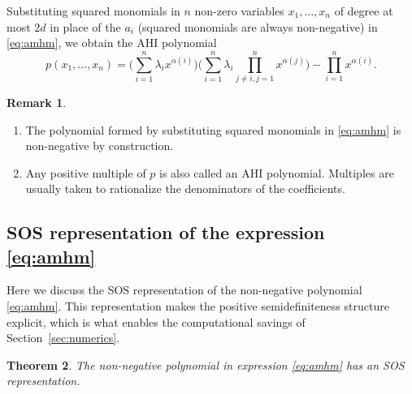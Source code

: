 \documentclass[12pt]{elsarticle}
\newtheorem{theorem}{Theorem}[section]
\theoremstyle{definition}
\newtheorem{remark}[theorem]{Remark}
\begin{document}
Substituting squared monomials in $n$ non-zero variables $x_1,\dots,x_n$ of degree at most $2d$ in place of the $a_i$ (squared monomials are always non-negative) in \eqref{eq:amhm}, we obtain the AHI polynomial
\begin{equation}\label{eq:ahi-sub}
    p(x_1,\dots,x_n)=\Big(\sum_{i=1}^n \lambda_i x^{\alpha(i)}\Big) \Big(\sum_{i=1}^n \lambda_i \prod_{{j\neq i}, j=1}^n x^{\alpha(j)}\Big) - \prod_{i=1}^n x^{\alpha(i)} .
\end{equation}

\begin{remark}\label{rem:basic}
\hfill
\begin{enumerate}
\item The polynomial formed by substituting squared monomials in \eqref{eq:amhm} is non-negative by construction.
\item Any positive multiple of $p$ is also called an AHI polynomial. Multiples are usually taken to rationalize the denominators of the coefficients.
\end{enumerate}
\end{remark}

\subsection{SOS representation of the expression \texorpdfstring{\eqref{eq:amhm}}{(3)}}\label{subsec:sos-rep}

Here we discuss the SOS representation of the non-negative polynomial \eqref{eq:amhm}. This representation makes the positive semidefiniteness structure explicit, which is what enables the computational savings of Section~\ref{sec:numerics}.

\begin{theorem}\label{thm:sos-rep}
The non-negative polynomial in expression \eqref{eq:amhm} has an SOS representation.
\end{theorem}
\end{document}
